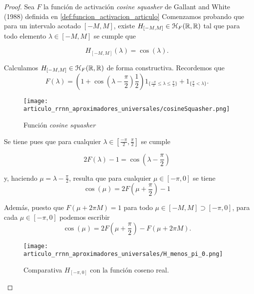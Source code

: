 \begin{proof}
    Sea $F$ la función de activación \textit{cosine squasher} de Gallant and White (1988) definida 
    en \ref{def:funcion_activacion_articulo} Comenzamos probando que para un intervalo acotado $[-M, M]$, existe $H_{[-M, M]} \in \mathcal{H}_F{(\mathbb{R}, \mathbb{R})}$ 
    tal que para todo elemento $\lambda \in [-M, M]$ se cumple que 

    \begin{equation}
        H_{[-M, M]}(\lambda) = \cos(\lambda).
    \end{equation}

    Calculamos $H_{[-M, M]} \in \mathcal{H}_F{(\mathbb{R}, \mathbb{R})}$  de forma constructiva. Recordemos que  
    \begin{equation}
        F(\lambda )= \left(1 + \cos\left(\lambda -\frac{\pi}{2} \right) \frac{1}{2}\right) 
         1_{\{\frac{-\pi}{2} \leq \lambda \leq  \frac{\pi}{2}\}}
         +
         1_{\{ \frac{\pi}{2} < \lambda \}}.
    \end{equation}
    
    \begin{figure}[h]
        \centering
        \texttt{[image: articulo\_rrnn\_aproximadores\_universales/cosineSquasher.png]}
        \caption{Función \textit{cosine squasher}}
        \label{fig:cosine_squaser}
    \end{figure}

    Se tiene pues que para cualquier $\lambda \in \left[ \frac{-\pi}{2}, \frac{\pi}{2}\right]$ se cumple

    \begin{equation}
        2 F(\lambda)-1 = \cos \left( \lambda - \frac{\pi}{2}\right)
    \end{equation}

    y, haciendo $\mu = \lambda - \frac{\pi}{2}$, resulta que para cualquier
    $\mu \in [-\pi, 0]$ se tiene 
    \begin{equation}
        \cos(\mu) = 2 F \left(\mu + \frac{\pi}{2} \right)  -1 
    \end{equation}

    Además, puesto que $F(\mu + 2 \pi M) = 1$ para todo $\mu \in [-M, M] \supset [-\pi, 0]$,
    para cada $\mu \in [-\pi, 0]$ podemos escribir
    \begin{equation}
        \cos(\mu) = 
        2 F \left(\mu + \frac{\pi}{2} \right)  - F(\mu + 2 \pi M). 
    \end{equation}

    \begin{figure}[h]
        \centering
        \texttt{[image: articulo\_rrnn\_aproximadores\_universales/H\_menos\_pi\_0.png]}
        \caption{Comparativa $H_{[-\pi, 0]}$ con la función coseno real. }
        \label{fig:coseno_vs_H_menos_pi_cero}
    \end{figure}


\end{proof}
